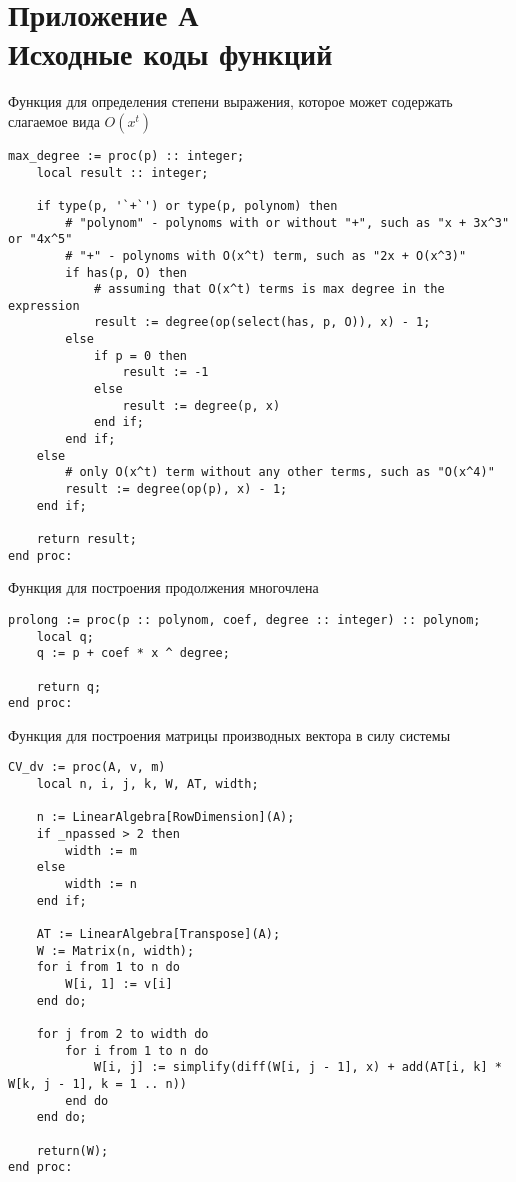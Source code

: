 \section*{Приложение А \\ Исходные коды функций}


Функция для определения степени выражения, которое может содержать слагаемое вида $O(x^t)$
\begin{lstlisting}[basicstyle=\scriptsize]
max_degree := proc(p) :: integer;
    local result :: integer;
    
    if type(p, '`+`') or type(p, polynom) then
        # "polynom" - polynoms with or without "+", such as "x + 3x^3" or "4x^5"
        # "+" - polynoms with O(x^t) term, such as "2x + O(x^3)"
        if has(p, O) then
            # assuming that O(x^t) terms is max degree in the expression
            result := degree(op(select(has, p, O)), x) - 1;
        else
            if p = 0 then
                result := -1
            else
                result := degree(p, x)
            end if;
        end if;
    else
        # only O(x^t) term without any other terms, such as "O(x^4)"
        result := degree(op(p), x) - 1;
    end if;
    
    return result;
end proc:
\end{lstlisting}


\bigskip
Функция для построения продолжения многочлена
\begin{lstlisting}[basicstyle=\scriptsize]
prolong := proc(p :: polynom, coef, degree :: integer) :: polynom;
    local q;
    q := p + coef * x ^ degree;
    
    return q;
end proc:
\end{lstlisting}


\newpage
Функция для построения матрицы производных вектора в силу системы
\begin{lstlisting}[basicstyle=\scriptsize]
CV_dv := proc(A, v, m)
    local n, i, j, k, W, AT, width;
    
    n := LinearAlgebra[RowDimension](A);
    if _npassed > 2 then
        width := m
    else
        width := n
    end if;
    
    AT := LinearAlgebra[Transpose](A);
    W := Matrix(n, width);
    for i from 1 to n do
        W[i, 1] := v[i]
    end do;
    
    for j from 2 to width do
        for i from 1 to n do
            W[i, j] := simplify(diff(W[i, j - 1], x) + add(AT[i, k] * W[k, j - 1], k = 1 .. n))
        end do
    end do;
    
    return(W);
end proc:
\end{lstlisting}


